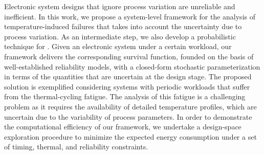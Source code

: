 Electronic system designs that ignore process variation are unreliable and inefficient.
In this work, we propose a system-level framework for the analysis of temperature-induced failures that takes into account the uncertainty due to process variation.
As an intermediate step, we also develop a probabilistic technique for \dssta.
Given an electronic system under a certain workload, our framework delivers the corresponding survival function, founded on the basis of well-established reliability models, with a closed-form stochastic parameterization in terms of the quantities that are uncertain at the design stage.
The proposed solution is exemplified considering systems with periodic workloads that suffer from the thermal-cycling fatigue.
The analysis of this fatigue is a challenging problem as it requires the availability of detailed temperature profiles, which are uncertain due to the variability of process parameters.
In order to demonstrate the computational efficiency of our framework, we undertake a design-space exploration procedure to minimize the expected energy consumption under a set of timing, thermal, and reliability constraints.
